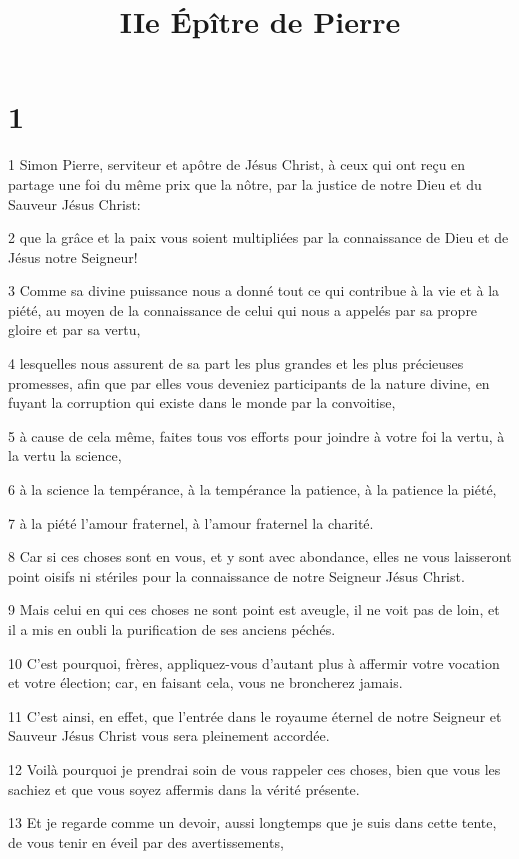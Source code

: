 

\title{IIe Épître de Pierre}


\chapter{1}

\par 1 Simon Pierre, serviteur et apôtre de Jésus Christ, à ceux qui ont reçu en partage une foi du même prix que la nôtre, par la justice de notre Dieu et du Sauveur Jésus Christ:
\par 2 que la grâce et la paix vous soient multipliées par la connaissance de Dieu et de Jésus notre Seigneur!
\par 3 Comme sa divine puissance nous a donné tout ce qui contribue à la vie et à la piété, au moyen de la connaissance de celui qui nous a appelés par sa propre gloire et par sa vertu,
\par 4 lesquelles nous assurent de sa part les plus grandes et les plus précieuses promesses, afin que par elles vous deveniez participants de la nature divine, en fuyant la corruption qui existe dans le monde par la convoitise,
\par 5 à cause de cela même, faites tous vos efforts pour joindre à votre foi la vertu, à la vertu la science,
\par 6 à la science la tempérance, à la tempérance la patience, à la patience la piété,
\par 7 à la piété l'amour fraternel, à l'amour fraternel la charité.
\par 8 Car si ces choses sont en vous, et y sont avec abondance, elles ne vous laisseront point oisifs ni stériles pour la connaissance de notre Seigneur Jésus Christ.
\par 9 Mais celui en qui ces choses ne sont point est aveugle, il ne voit pas de loin, et il a mis en oubli la purification de ses anciens péchés.
\par 10 C'est pourquoi, frères, appliquez-vous d'autant plus à affermir votre vocation et votre élection; car, en faisant cela, vous ne broncherez jamais.
\par 11 C'est ainsi, en effet, que l'entrée dans le royaume éternel de notre Seigneur et Sauveur Jésus Christ vous sera pleinement accordée.
\par 12 Voilà pourquoi je prendrai soin de vous rappeler ces choses, bien que vous les sachiez et que vous soyez affermis dans la vérité présente.
\par 13 Et je regarde comme un devoir, aussi longtemps que je suis dans cette tente, de vous tenir en éveil par des avertissements,

